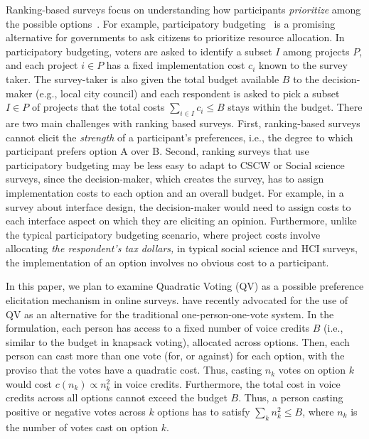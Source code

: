 Ranking-based surveys focus on understanding how participants \textit{prioritize} among the possible options~\cite{moors2016two}. For example, participatory budgeting~\cite{cabannes2004participatory,goel2015knapsack,Goel2016, Lee2014, benade2020preference} is a promising alternative for governments to ask citizens to prioritize resource allocation.  In participatory budgeting, voters are asked to identify a subset $I$ among projects $P$, and each project $i \in P$ has a fixed implementation cost $c_i$ known to the survey taker. The survey-taker is also given the total budget available $B$ to the decision-maker (e.g., local city council) and each respondent is asked to pick a subset $I \in P$ of projects that the total costs $\sum_{i \in I} c_i \leqslant B$ stays within the budget. There are two main challenges with ranking based surveys. First, ranking-based surveys cannot elicit the \textit{strength} of a participant's preferences, i.e., the degree to which participant prefers option A over B. Second, ranking surveys that use participatory budgeting may be less easy to adapt to CSCW or Social science surveys, since the decision-maker, which creates the survey, has to assign implementation costs to each option and an overall budget. For example, in a survey about interface design, the decision-maker would need to assign costs to each interface aspect on which they are eliciting an opinion. Furthermore, unlike the typical participatory budgeting scenario, where project costs involve allocating \textit{the respondent's tax dollars,} in typical social science and HCI surveys, the implementation of an option involves no obvious cost to a participant. 




In this paper, we plan to examine Quadratic Voting (QV) as a possible preference elicitation mechanism in online surveys. \textcite{posner2018radical} have recently advocated for the use of QV as an alternative for the traditional one-person-one-vote system. In the \textcite{posner2018radical} formulation, each person has access to a fixed number of voice credits $B$ (i.e., similar to the budget in knapsack voting), allocated across options. Then, each person can cast more than one vote (for, or against) for each option, with the proviso that the votes have a quadratic cost. Thus, casting $n_k$ votes on option $k$ would cost $c(n_k) \propto n_k^2$ in voice credits. Furthermore, the total cost in voice credits across all options cannot exceed the budget $B$. Thus, a person casting positive or negative votes across $k$ options has to satisfy $\sum_k n_k^2 \leqslant B$, where $n_k$ is the number of votes cast on option $k$. 

